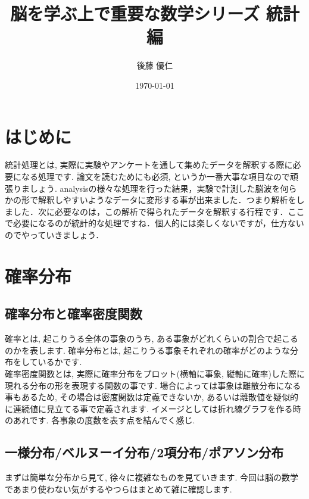 \documentclass[11pt,a4paper]{jsarticle}                    %
\title{脳を学ぶ上で重要な数学シリーズ 統計編}
\author{後藤 優仁}
\date{\today}
\begin{document}
\maketitle
%
%
\tableofcontents

\section{はじめに}
 統計処理とは, 実際に実験やアンケートを通して集めたデータを解釈する際に必要になる処理です. 論文を読むためにも必須, というか一番大事な項目なので頑張りましょう. analysisの様々な処理を行った結果，実験で計測した脳波を何らかの形で解釈しやすいようなデータに変形する事が出来ました．つまり解析をしました．次に必要なのは，この解析で得られたデータを解釈する行程です．ここで必要になるのが統計的な処理ですね．個人的には楽しくないですが，仕方ないのでやっていきましょう．
 
 
\section{確率分布}
\subsection{確率分布と確率密度関数}
確率とは, 起こりうる全体の事象のうち, ある事象がどれくらいの割合で起こるのかを表します. 確率分布とは, 起こりうる事象それぞれの確率がどのような分布をしているかです. \\
確率密度関数とは, 実際に確率分布をプロット(横軸に事象, 縦軸に確率)した際に現れる分布の形を表現する関数の事です. 場合によっては事象は離散分布になる事もあるため, その場合は密度関数は定義できないか, あるいは離散値を疑似的に連続値に見立てる事で定義されます. イメージとしては折れ線グラフを作る時のあれです. 各事象の度数を表す点を結んでく感じ.\\

\subsection{一様分布/ベルヌーイ分布/2項分布/ポアソン分布}
まずは簡単な分布から見て, 徐々に複雑なものを見ていきます. 今回は脳の数学であまり使わない気がするやつらはまとめて雑に確認します.\\
\end{document}
